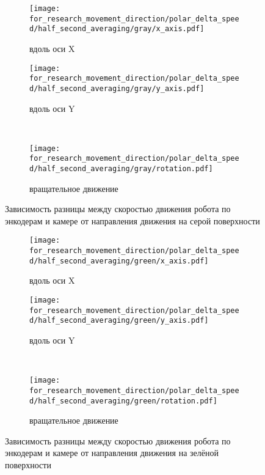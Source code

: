 \begin{figure}[H]
    \centering
    \begin{subfigure}{0.49\textwidth}
        \centering
        \texttt{[image: for\_research\_movement\_direction/polar\_delta\_speed/half\_second\_averaging/gray/x\_axis.pdf]}
        \caption{вдоль оси X}
    \end{subfigure}
    \hspace{0.005\textwidth}
    \begin{subfigure}{0.49\textwidth}
        \centering
        \texttt{[image: for\_research\_movement\_direction/polar\_delta\_speed/half\_second\_averaging/gray/y\_axis.pdf]}
        \caption{вдоль оси Y}
    \end{subfigure} \\
    \vspace{4pt}
    \centering
    \begin{subfigure}{0.49\textwidth}
        \centering
        \texttt{[image: for\_research\_movement\_direction/polar\_delta\_speed/half\_second\_averaging/gray/rotation.pdf]}
        \caption{вращательное движение}
    \end{subfigure}
    \caption{Зависимость разницы между скоростью движения робота по энкодерам и камере от направления движения на серой поверхности}
\end{figure}

\begin{figure}[H]
    \centering
    \begin{subfigure}{0.49\textwidth}
        \centering
        \texttt{[image: for\_research\_movement\_direction/polar\_delta\_speed/half\_second\_averaging/green/x\_axis.pdf]}
        \caption{вдоль оси X}
    \end{subfigure}
    \hspace{0.005\textwidth}
    \begin{subfigure}{0.49\textwidth}
        \centering
        \texttt{[image: for\_research\_movement\_direction/polar\_delta\_speed/half\_second\_averaging/green/y\_axis.pdf]}
        \caption{вдоль оси Y}
    \end{subfigure} \\
    \vspace{4pt}
    \centering
    \begin{subfigure}{0.49\textwidth}
        \centering
        \texttt{[image: for\_research\_movement\_direction/polar\_delta\_speed/half\_second\_averaging/green/rotation.pdf]}
        \caption{вращательное движение}
    \end{subfigure}
    \caption{Зависимость разницы между скоростью движения робота по энкодерам и камере от направления движения на зелёной поверхности}
\end{figure}

